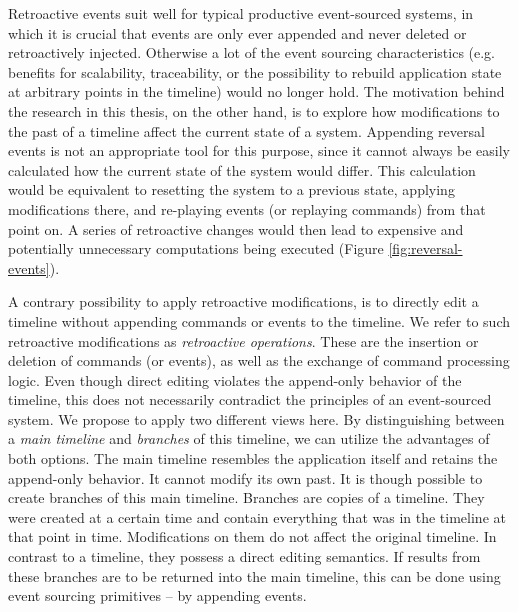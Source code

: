 Retroactive events suit well for typical productive event-sourced systems, in
which it is crucial that events are only ever appended and never deleted or
retroactively injected. Otherwise a lot of the event sourcing characteristics 
(e.g. benefits for scalability, traceability, or the possibility to rebuild
application state at arbitrary points in the timeline) would no longer hold.
The motivation behind the research in this thesis, on the other hand, is to
explore how modifications to the past of a timeline affect the current state 
of a system. Appending reversal events is not an appropriate tool for 
this purpose, since it cannot always be easily calculated how the current
state of the system would differ. 
This calculation would be equivalent to resetting the system to a previous 
state, applying modifications there, and re-playing events (or replaying 
commands) from that point on.
A series of retroactive changes would then lead to expensive and potentially 
unnecessary computations being executed (Figure \ref{fig:reversal-events}).

A contrary possibility to apply retroactive modifications, is to directly edit 
a timeline without appending commands or events to the timeline.
We refer to such retroactive modifications as \emph{retroactive operations}. 
These are the insertion or deletion of commands (or events), as well as the
exchange of command processing logic.
Even though direct editing violates the append-only behavior of the timeline, 
this does not necessarily contradict the principles of an event-sourced system. 
We propose to apply two different views here. By distinguishing between a 
\emph{main timeline} and \emph{branches} of this timeline, we can utilize the 
advantages of both options. 
The main timeline resembles the application itself and retains the append-only 
behavior. It cannot modify its own past. It is though possible to create 
branches of this main timeline.
Branches are copies of a timeline. They were created at a certain time and
contain everything that was in the timeline at that point in time. 
Modifications on them do not affect the original timeline. In contrast to a 
timeline, they possess a direct editing semantics. 
If results from these branches are to be returned into the main timeline, this 
can be done using event sourcing primitives -- by appending events.


